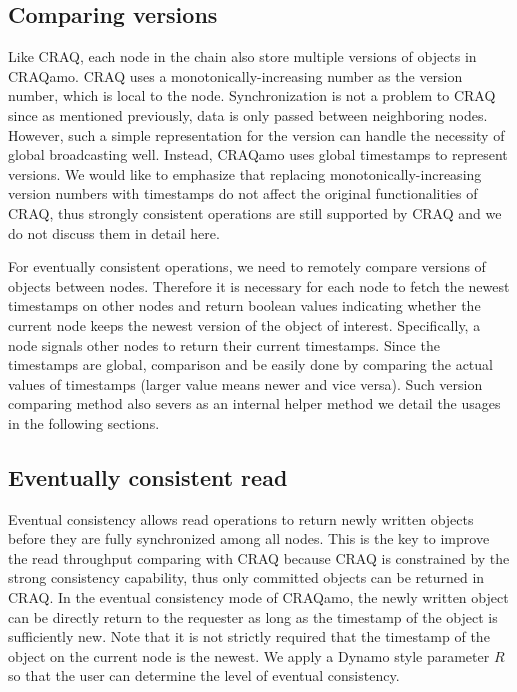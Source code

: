 \subsection{Comparing versions}
Like CRAQ, each node in the chain also store multiple versions of objects in CRAQamo. CRAQ uses a monotonically-increasing number as the version number, which is local to the node. Synchronization is not a problem to CRAQ since as mentioned previously, data is only passed between neighboring nodes. However, such a simple representation for the version can handle the necessity of global broadcasting well. Instead, CRAQamo uses global timestamps to represent versions. We would like to emphasize that replacing monotonically-increasing version numbers with timestamps do not affect the original functionalities of CRAQ, thus strongly consistent operations are still supported by CRAQ and we do not discuss them in detail here.

For eventually consistent operations, we need to remotely compare versions of objects between nodes. Therefore it is necessary for each node to fetch the newest timestamps on other nodes and return boolean values indicating whether the current node keeps the newest version of the object of interest. Specifically, a node signals other nodes to return their current timestamps. Since the timestamps are global, comparison and be easily done by comparing the actual values of timestamps (larger value means newer and vice versa). Such version comparing method also severs as an internal helper method we detail the usages in the following sections. 

\subsection{Eventually consistent read}
Eventual consistency allows read operations to return newly written objects before they are fully synchronized among all nodes. This is the key to improve the read throughput comparing with CRAQ because CRAQ is constrained by the strong consistency capability, thus only committed objects can be returned in CRAQ. In the eventual consistency mode of CRAQamo, the newly written object can be directly return to the requester as long as the timestamp of the object is sufficiently new. Note that it is not strictly required that the timestamp of the object on the current node is the newest. We apply a Dynamo style parameter $R$ so that the user can determine the level of eventual consistency.

